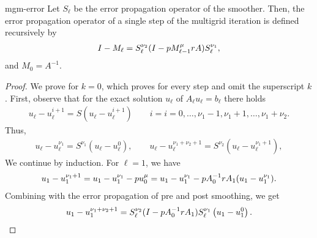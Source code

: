 \begin{Lemma}{mgm-error}
  Let $S_\ell$ be the error propagation operator of the
  smoother. Then, the error propagation operator of a single step of
  the multigrid iteration is defined recursively by
  \begin{gather}
    I - M_\ell = S_\ell^{\nu_2}
    (I-p M_{\ell-1}^{\mu}r A)
    S_\ell^{\nu_1},
  \end{gather}
  and $M_0 = A^{-1}$.
\end{Lemma}

\begin{proof}
  We prove for $k=0$, which proves for every step and omit the superscript $k$.
  First, observe that for the exact solution $u_\ell$ of
  $A_\ell u_\ell = b_\ell$ there holds
  \begin{gather*}
    u_\ell - u_\ell^{i+1}
    = S \left(u_\ell - u_\ell^{i+1}\right)
    \qquad i=i=0,\dots,\nu_1-1,\nu_1+1,\dots,\nu_1+\nu_2.
  \end{gather*}
  Thus,
  \begin{gather*}
    u_\ell - u_\ell^{\nu_1} = S^{\nu_1}(u_\ell - u_\ell^{0}),
    \qquad
    u_\ell - u_\ell^{\nu_1+\nu_2+1}
    = S^{\nu_2}(u_\ell - u_\ell^{\nu_1+1}),
  \end{gather*}
  We continue by induction. For $\ell=1$, we have
  \begin{gather*}
    u_1-u_1^{\nu_1+1}
    = u_1-u_1^{\nu_1} - p u_{0}^{\mu}
    = u_1-u_1^{\nu_1} - p A_0^{-1}
     r A_1(u_1-u_1^{\nu_1}).
   \end{gather*}
   Combining with the error propagation of pre and post smoothing, we
   get
  \begin{gather*}
    u_1 -u_1^{\nu_1+\nu_2+1}
    = S_\ell^{\nu_2}
    (I-p A_0^{-1} r A_1)
    S_\ell^{\nu_1} \left(u_1 -u_1^{0}\right).
  \end{gather*}
\end{proof}

